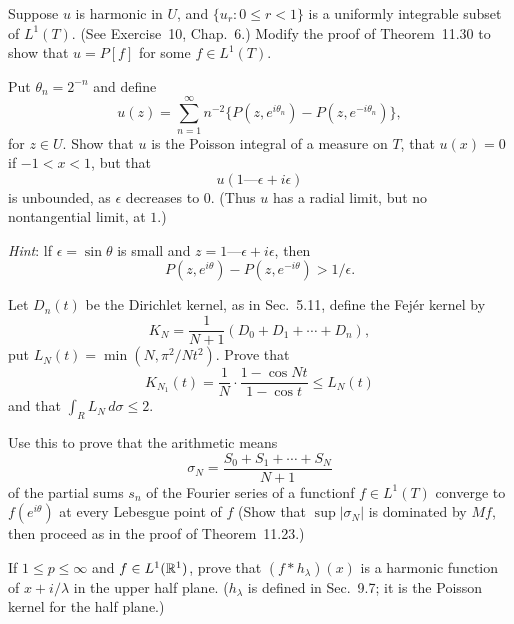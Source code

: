 \begin{enumerate}
\begin{excopy}
Suppose $u$ is harmonic in $U$, and 
\(\{u_r: 0 \leq r < 1\}\) is a uniformly integrable subset of 
\(L^1(T)\). (See
Exercise~10, Chap.~6.) Modify the proof of Theorem~11.30 to show that
\(u = P[f]\) for some \(f \in L^1(T)\).

\end{excopy}


\begin{excopy}
Put \(\theta_n = 2^{-n}\) and define
\begin{equation*}
u(z) = \sum_{n=1}^\infty n^{-2}\{P(z,e^{i\theta_n}) - P(z,e^{-i\theta_n})\},
\end{equation*}
for \(z \in U\). Show that $u$ is the Poisson integral of a measure on $T$,
 that \(u(x) = 0\) if \(-1 < x < 1\), but
that
\begin{equation*}
u(1 — \epsilon + i\epsilon)
\end{equation*}
is unbounded, as \(\epsilon\) decreases to $0$. 
(Thus $u$ has a radial limit, but no nontangential limit, at $1$.)

\emph{Hint}: lf \(\epsilon = \sin \theta\) is small and 
\(z = 1 — \epsilon + i\epsilon\), then
\begin{equation*}
 P(z,e^{i\theta}) - P(z,e^{-i\theta}) > 1/\epsilon.
\end{equation*}
\end{excopy}


\begin{excopy}
Let \(D_n(t)\) be the 
 Dirichlet kernel, as in Sec.~5.11, define the 
 Fej\'er 
kernel by
\begin{equation*}
K_N = \frac{1}{N+1} (D_0 + D_1 + \cdots + D_n),
\end{equation*}
put \(L_N(t) = \min(N, \pi^2/Nt^2)\). Prove that
\begin{equation*}
K_{N_1}(t) = \frac{1}{N} \cdot \frac{1 - \cos Nt}{1 - \cos t} \leq L_N(t)
\end{equation*}
and that \(\int_R L_N\,d\sigma \leq 2\).

Use this to prove that the arithmetic means
\begin{equation*}
\sigma_N = \frac{S_0 + S_1 + \cdots + S_N}{N + 1}
\end{equation*}
of the partial sums \(s_n\) of the Fourier series of a functionf
\(f \in L^1(T)\) converge to \(f(e^{i\theta})\) at every Lebesgue
point of $f$ (Show that \(\sup |\sigma_N|\) is dominated by \(Mf\),
 then proceed as in the proof of Theorem~11.23.)
\end{excopy}

\begin{excopy}
If \(1 \leq p \leq \infty\) and \(f \in L^1(\mathbb{R}^1)\), prove that
 \((f * h_\lambda)(x)\) is a harmonic function of \(x + i/\lambda\) in the upper
half plane. 
(\(h_\lambda\) is defined in Sec.~9.7; 
it is the Poisson kernel for the half plane.)
\end{excopy}

\end{enumerate}



